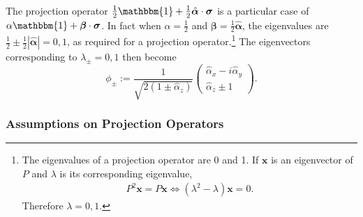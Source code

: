 \documentclass[12pt]{article}
\begin{document}
The projection operator $\tfrac{1}{2} \mathbbm{1} + \tfrac{1}{2} \hat{\bm{\alpha}} \cdot \bm{\sigma}$ is a particular case of $\alpha \mathbbm{1} + \bm{\beta} \cdot \bm{\sigma}$. In fact when $\alpha = \tfrac{1}{2}$ and $\bm{\beta} = \tfrac{1}{2}\hat{\bm{\alpha}}$, the eigenvalues are $\tfrac{1}{2} \pm \tfrac{1}{2} |\hat{\bm{\alpha}}| = 0,1$, as required for a projection operator.\footnote{The eigenvalues of a projection operator are 0 and 1.  If $\bm{x}$ is an eigenvector of $P$ and $\lambda$ is its corresponding eigenvalue,
\begin{align*}
  P^2 \bm{x} = P \bm{x} \Leftrightarrow (\lambda^2 - \lambda) \bm{x} = 0.
\end{align*}
Therefore $\lambda = 0,1$.}
The eigenvectors corresponding to $\lambda_{\pm} = 0,1$ then become
\begin{displaymath}
  \phi_{\pm}
  := \frac{1}{\sqrt{2 (1 \pm \hat{\alpha}_z)}}
  \begin{pmatrix}
    \hat{\alpha}_x - i \hat{\alpha}_y \\
    \hat{\alpha}_z \pm 1
  \end{pmatrix}.
\end{displaymath}


\subsubsection{Assumptions on Projection Operators}
\end{document}
